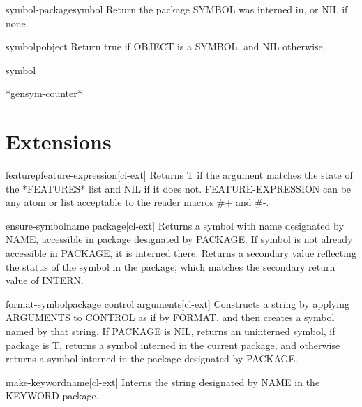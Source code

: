 \documentclass[10pt,english]{book}
\begin{document}
\begin{function}{symbol-package}{symbol}
  Return the package SYMBOL was interned in, or NIL if none.
\end{function}

\begin{function}{symbolp}{object}
  Return true if OBJECT is a SYMBOL, and NIL otherwise.
\end{function}

\begin{class}{symbol}{}
  
\end{class}

\begin{variable}{*gensym-counter*}{}
  
\end{variable}

\section{Extensions}
\label{sec:extensions}

\begin{function}{featurep}{feature-expression}[cl-ext]
  Returns T if the argument matches the state of the *FEATURES*
list and NIL if it does not. FEATURE-EXPRESSION can be any atom
or list acceptable to the reader macros \#+ and \#-.
\end{function}

\begin{function}{ensure-symbol}{name \op package}[cl-ext]
  Returns a symbol with name designated by NAME, accessible in package
designated by PACKAGE. If symbol is not already accessible in PACKAGE, it is
interned there. Returns a secondary value reflecting the status of the symbol
in the package, which matches the secondary return value of INTERN.
\end{function}

\begin{function}{format-symbol}{package control \rest arguments}[cl-ext]
  Constructs a string by applying ARGUMENTS to CONTROL as if by FORMAT, and
then creates a symbol named by that string. If PACKAGE is NIL, returns an
uninterned symbol, if package is T, returns a symbol interned in the current
package, and otherwise returns a symbol interned in the package designated by
PACKAGE.
\end{function}

\begin{function}{make-keyword}{name}[cl-ext]
  Interns the string designated by NAME in the KEYWORD package.
\end{function}
\end{document}
